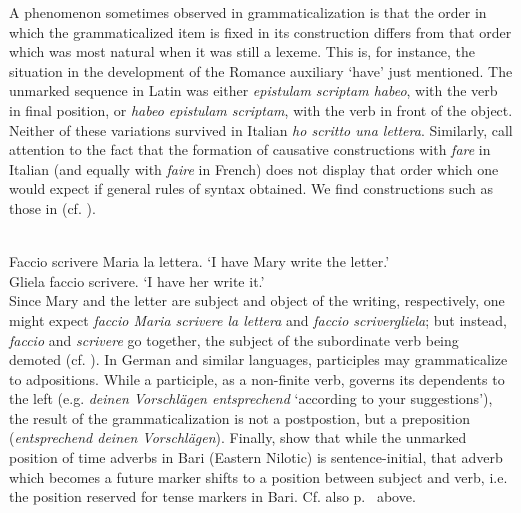 A phenomenon sometimes observed in grammaticalization is that the order in which the grammaticalized item is fixed in its construction differs from that order which was most natural when it was still a lexeme. This is, for instance, the situation in the development of the Romance auxiliary ‘have’ just mentioned. The unmarked sequence in Latin was either \textit{epistulam scriptam habeo}, with the verb in final position, or \textit{habeo epistulam scriptam}, with the verb in front of the object. Neither of these variations survived in Italian \textit{ho scritto una lettera}. Similarly, \citet[423f]{MallinsonEtAl1981} call attention to the fact that the formation of causative constructions with \textit{fare} in Italian (and equally with \textit{faire} in French) does not display that order which one would expect if general rules of syntax obtained. We find constructions such as those in  (cf. \citealt[162]{Comrie1981b}).

\ea\label{ex:E112}
\langinfo{\LangItal}{}{}\\
 \ea  Faccio scrivere Maria la lettera.
 \glt ‘I have Mary write the letter.’\\
 \ex  Gliela faccio scrivere. 
\glt ‘I have her write it.’\\
\z
\z
\noindent Since Mary and the letter are subject and object of the writing, respectively, one might expect \textit{faccio Maria scrivere la lettera} and \textit{faccio scrivergliela}; but instead, \textit{faccio} and \textit{scrivere} go together, the subject of the subordinate verb being demoted (cf. \citealt[§8.2]{Comrie1981b}). In German and similar languages, participles may grammaticalize to adpositions. While a participle, as a non-finite  verb, governs its dependents to the left (e.g. \textit{deinen Vorschlägen entsprechend} ‘according to your suggestions’), the result of the grammaticalization is not a postpostion, but a preposition (\textit{entsprechend deinen Vorschlägen}). Finally, \citet[132]{HeineEtAl1984} show that while the unmarked position of time adverbs in Bari (Eastern Nilotic) is sentence-initial, that adverb which becomes a future marker shifts to a position between subject and verb, i.e. the position reserved for tense markers in Bari. Cf. also p.~\pageref{page39b}\chk%
 above.

